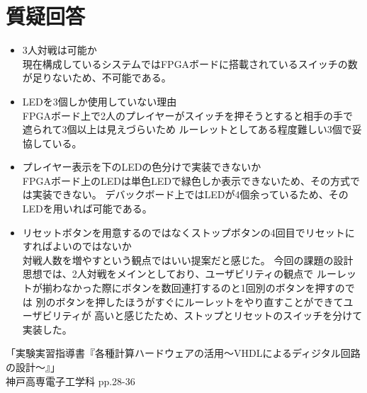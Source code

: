 \documentclass{ltjsarticle}
\begin{document}
\section{質疑回答}
	\begin{itemize}
		\item 3人対戦は可能か\\
			現在構成しているシステムではFPGAボードに搭載されているスイッチの数が足りないため、不可能である。\\
		\item LEDを3個しか使用していない理由\\
			FPGAボード上で2人のプレイヤーがスイッチを押そうとすると相手の手で遮られて3個以上は見えづらいため
			ルーレットとしてある程度難しい3個で妥協している。\\
		\item プレイヤー表示を下のLEDの色分けで実装できないか\\
			FPGAボード上のLEDは単色LEDで緑色しか表示できないため、その方式では実装できない。
			デバックボード上ではLEDが4個余っているため、そのLEDを用いれば可能である。\\
		\item リセットボタンを用意するのではなくストップボタンの4回目でリセットにすればよいのではないか\\
			対戦人数を増やすという観点ではいい提案だと感じた。
			今回の課題の設計思想では、2人対戦をメインとしており、ユーザビリティの観点で
			ルーレットが揃わなかった際にボタンを数回連打するのと1回別のボタンを押すのでは
			別のボタンを押したほうがすぐにルーレットをやり直すことができてユーザビリティが
			高いと感じたため、ストップとリセットのスイッチを分けて実装した。\\
	\end{itemize}

\begin{thebibliography}{99}
「実験実習指導書『各種計算ハードウェアの活用〜VHDLによるディジタル回路の設計〜』」\\
神戸高専電子工学科 pp.28-36
\end{thebibliography}
\end{document}
